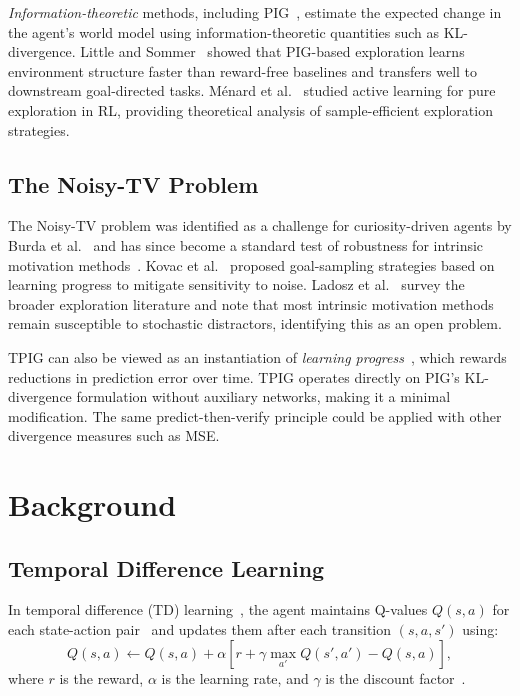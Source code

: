 \documentclass[letterpaper]{article}
\begin{document}
\emph{Information-theoretic} methods, including PIG~\cite{10.3389/fncir.2013.00037},
estimate the expected change in the agent's world model using
information-theoretic quantities such as KL-divergence.  Little and
Sommer~ showed that PIG-based
exploration learns environment structure faster than reward-free
baselines and transfers well to downstream goal-directed tasks.
M\'{e}nard et al.~\cite{DBLP:journals/corr/abs-2007-13442}
studied active learning for pure exploration in RL, providing
theoretical analysis of sample-efficient exploration strategies.

\subsection{The Noisy-TV Problem}

The Noisy-TV problem was identified as a challenge for
curiosity-driven agents by Burda et
al.~\cite{Burda2019curiosity} and has since become a standard test
of robustness for intrinsic motivation
methods~\cite{DBLP:journals/corr/abs-2008-04388}.  Kovac et
al.~ proposed
goal-sampling strategies based on learning progress to mitigate
sensitivity to noise.  Ladosz et
al.~\cite{Ladosz_2022} survey the broader exploration literature and
note that most intrinsic motivation methods remain susceptible to
stochastic distractors, identifying this as an open problem.

TPIG can also be viewed as an instantiation of \emph{learning
progress}~\cite{Oudeyer2007intrinsic}, which rewards reductions in
prediction error over time.  TPIG operates directly on PIG's
KL-divergence formulation without auxiliary networks, making it a
minimal modification.  The same predict-then-verify principle could
be applied with other divergence measures such as MSE.

\section{Background}

\subsection{Temporal Difference Learning}

In temporal difference (TD) learning~\cite{Sutton1998}, the agent
maintains Q-values $Q(s,a)$ for each state-action
pair~\cite{Watkins1992Qlearning} and updates them after each
transition $(s,a,s')$ using:
\begin{equation}
  Q(s,a) \leftarrow Q(s,a) + \alpha \left[r + \gamma \max_{a'} Q(s',a') - Q(s,a)\right],
  \label{eq:TDQVF}
\end{equation}
where $r$ is the reward, $\alpha$ is the learning rate, and $\gamma$
is the discount factor~\cite{Sutton1998}.
\end{document}
